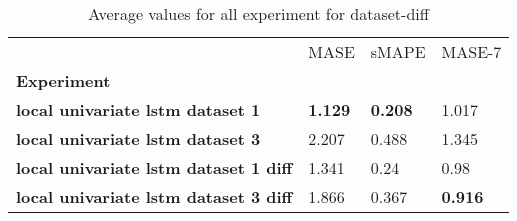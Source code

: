 \begin{table}[h]
\centering
\caption{Average values for all experiment for dataset-diff}
\label{table:Average-metric-dataset-diff}
\begin{tabular}{llll}
\toprule
{} &            MASE &           sMAPE &          MASE-7 \\
\textbf{Experiment                          } &                 &                 &                 \\
\midrule
\textbf{local univariate lstm dataset 1     } &  \textbf{1.129} &  \textbf{0.208} &           1.017 \\
\textbf{local univariate lstm dataset 3     } &           2.207 &           0.488 &           1.345 \\
\textbf{local univariate lstm dataset 1 diff} &           1.341 &            0.24 &            0.98 \\
\textbf{local univariate lstm dataset 3 diff} &           1.866 &           0.367 &  \textbf{0.916} \\
\bottomrule
\end{tabular}
\end{table}
